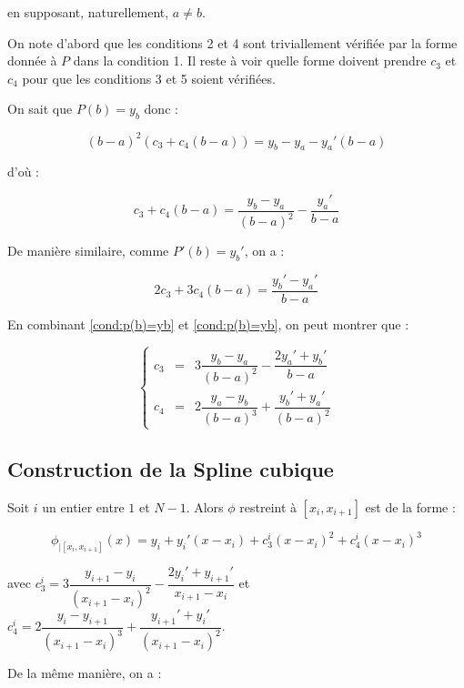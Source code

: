en supposant, naturellement, $a \neq b$.

On note d'abord que les conditions 2 et 4 sont triviallement vérifiée par la forme donnée à $P$ dans la condition 1.
Il reste à voir quelle forme doivent prendre $c_3$ et $c_4$ pour que les conditions 3 et 5 soient vérifiées.

On sait que $P(b) = y_b$ donc :

$$(b-a)^2 (c_3 + c_4 (b-a)) = y_b - y_a - y_a' (b-a)$$

d'où :

\begin{equation}
c_ 3 + c_4 (b-a) = \dfrac{y_b - y_a}{(b-a)^2} - \dfrac{y_a'}{b-a}
\label{cond:p(b)=yb}
\end{equation}

De manière similaire, comme $P'(b) = y_b'$, on a :

\begin{equation}
2 c_3 + 3 c_4 (b-a) = \dfrac{y_b' - y_a'}{b-a}
\label{cond:p'(b)=yb'}
\end{equation}

En combinant \eqref{cond:p(b)=yb} et \eqref{cond:p(b)=yb}, on peut montrer que :

\begin{equation}
\left\lbrace
\begin{array}{rcl}
c_3 & = & 3 \dfrac{y_b - y_a}{(b-a)^2} - \dfrac{2 y_a' + y_b'}{b-a} \\
c_ 4 & = & 2 \dfrac{y_a - y_b}{(b-a)^3} + \dfrac{y_b' + y_a'}{(b-a)^2}
\end{array}
\right.
\label{cond:c3 and c4}
\end{equation}

\subsection{Construction de la Spline cubique}

Soit $i$ un entier entre $1$ et $N-1$.
Alors $\phi$ restreint à $[x_i, x_{i+1}]$ est de la forme :

\begin{equation}
\phi_{|[x_i, x_{i+1}]} (x) = y_i + y_i' (x-x_i) + c_3^i (x-x_i)^2 + c_4^i (x-x_i)^3
\end{equation}

avec $c_3^i = 3 \dfrac{y_{i+1} - y_i}{(x_{i+1}-x_i)^2} - \dfrac{2 y_i' + y_{i+1}'}{x_{i+1}-x_i}$ et 
$c_4^i = 2 \dfrac{y_i - y_{i+1}}{(x_{i+1}-x_i)^3} + \dfrac{y_{i+1}' + y_i'}{(x_{i+1}-x_i)^2}$.

De la même manière, on a :

